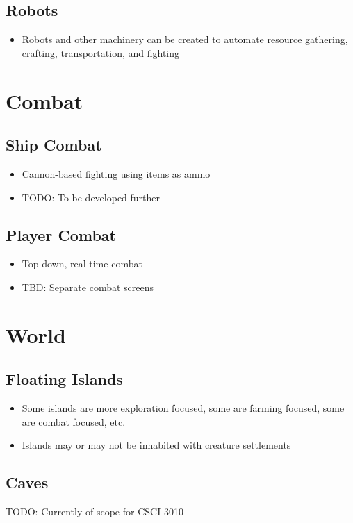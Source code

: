 \documentclass[a4paper]{scrreprt}
\begin{document}
\subsection{Robots}
\begin{itemize}
\item Robots and other machinery can be created to automate resource gathering, crafting, transportation, and fighting
\end{itemize}

\section{Combat}

\subsection{Ship Combat}
\begin{itemize}
\item Cannon-based fighting using items as ammo
\item TODO: To be developed further
\end{itemize}

\subsection{Player Combat}
\begin{itemize}
\item Top-down, real time combat
\item TBD: Separate combat screens
\end{itemize}


\section{World}

\subsection{Floating Islands}
\begin{itemize}
\item Some islands are more exploration focused, some are farming focused, some are combat focused, etc.
\item Islands may or may not be inhabited with creature settlements
\end{itemize}

\subsection{Caves}
TODO: Currently of scope for CSCI 3010
\end{document}
